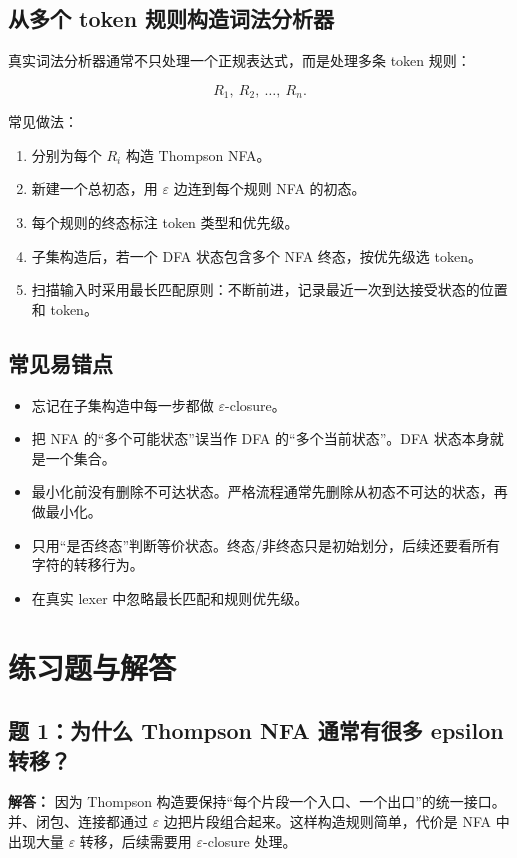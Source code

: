 \documentclass[UTF8,fontset=none,11pt]{ctexart}
\newcommand{\eps}{\varepsilon}
\begin{document}
\subsection{从多个 token 规则构造词法分析器}

真实词法分析器通常不只处理一个正规表达式，而是处理多条 token 规则：

\[
R_1,\ R_2,\ \ldots,\ R_n.
\]

常见做法：

\begin{enumerate}
  \item 分别为每个 \(R_i\) 构造 Thompson NFA。
  \item 新建一个总初态，用 \(\eps\) 边连到每个规则 NFA 的初态。
  \item 每个规则的终态标注 token 类型和优先级。
  \item 子集构造后，若一个 DFA 状态包含多个 NFA 终态，按优先级选 token。
  \item 扫描输入时采用最长匹配原则：不断前进，记录最近一次到达接受状态的位置和 token。
\end{enumerate}

\subsection{常见易错点}

\begin{itemize}
  \item 忘记在子集构造中每一步都做 \(\eps\)-closure。
  \item 把 NFA 的“多个可能状态”误当作 DFA 的“多个当前状态”。DFA 状态本身就是一个集合。
  \item 最小化前没有删除不可达状态。严格流程通常先删除从初态不可达的状态，再做最小化。
  \item 只用“是否终态”判断等价状态。终态/非终态只是初始划分，后续还要看所有字符的转移行为。
  \item 在真实 lexer 中忽略最长匹配和规则优先级。
\end{itemize}

\section{练习题与解答}

\subsection*{题 1：为什么 Thompson NFA 通常有很多 epsilon 转移？}

\textbf{解答：} 因为 Thompson 构造要保持“每个片段一个入口、一个出口”的统一接口。并、闭包、连接都通过 \(\eps\) 边把片段组合起来。这样构造规则简单，代价是 NFA 中出现大量 \(\eps\) 转移，后续需要用 \(\eps\)-closure 处理。
\end{document}
